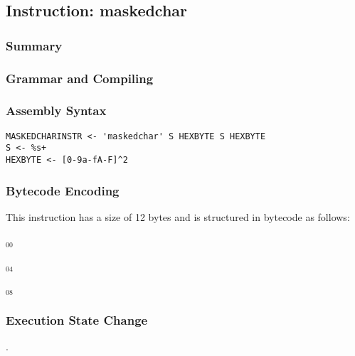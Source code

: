 \subsection{Instruction: maskedchar}

\subsubsection{Summary}


\subsubsection{Grammar and Compiling}


\subsubsection{Assembly Syntax}

\begin{myquote}
\begin{verbatim}
MASKEDCHARINSTR <- 'maskedchar' S HEXBYTE S HEXBYTE
S <- %s+
HEXBYTE <- [0-9a-fA-F]^2
\end{verbatim}
\end{myquote}


\subsubsection{Bytecode Encoding}

This instruction has a size of 12 bytes and is structured in bytecode as follows:

$_{00}$\ 



$_{04}$\ 



$_{08}$\ 
\fbox{%
  \parbox{20pt}{%
00
  }%
}


\subsubsection{Execution State Change}

.


